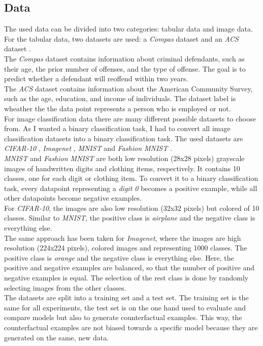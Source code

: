 \documentclass{article}
\begin{document}
\subsection{Data}
The used data can be divided into two categories: tabular data and image data. For the tabular data, two datasets are used: a \textit{Compas} dataset \cite{compas_dataset} and an \textit{ACS} dataset \cite{acs_dataset}. \\
The \textit{Compas} dataset contains information about criminal defendants, such as their age, the prior number of offenses, and the type of offense. The goal is to predict whether a defendant will reoffend within two years. \\
The \textit{ACS} dataset contains information about the American Community Survey, such as the age, education, and income of individuals. The dataset label is wheather the the data point represents a person who is employed or not. \\
For image classification data there are many different possible datasets to choose from. As I wanted a binary classification task, I had to convert all image classification datasets into a binary classification task. The used datasets are \textit{CIFAR-10} \cite{cifar10_dataset}, \textit{Imagenet} \cite{imagenet_dataset}, \textit{MNIST} \cite{mnist_dataset} and \textit{Fashion MNIST} \cite{fashion_mnist}.\\
\textit{MNIST} and \textit{Fashion MNIST} are both low resolution (28x28 pixels) grayscale images of handwritten digits and clothing items, respectively. It contains 10 classes, one for each digit or clothing item. To convert it to a binary classification task, every datapoint representing a \textit{digit 0} becomes a positive example, while all other datapoints become negative examples. \\
For \textit{CIFAR-10}, the images are also low resolution (32x32 pixels) but colored of 10 classes. Similar to \textit{MNIST}, the positive class is \textit{airplane} and the negative class is everything else. \\
The same approach has been taken for \textit{Imagenet}, where the images are high resolution (224x224 pixels), colored images and representing 1000 classes. The positive class is \textit{orange} and the negative class is everything else. Here, the positive and negative examples are balanced, so that the number of positive and negative examples is equal. The selection of the rest class is done by randomly selecting images from the other classes. \\
The datasets are split into a training set and a test set. The training set is the same for all experiments, the test set is on the one hand used to evaluate and compare models but also to generate counterfactual examples. This way, the counterfactual examples are not biased towards a specific model because they are generated on the same, new data. 
\end{document}
